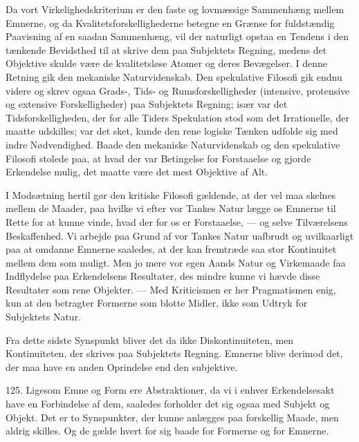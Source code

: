 \documentclass[12pt,a4paper]{book}
\newcommand{\apage}[1]{\marginnote{\footnotesize\textit{[#1]}}}
\begin{document}
Da vort Virkelighedskriterium er den faste og lovmæssige Sammenhæng mellem Emnerne, og
da Kvalitetsforskellighederne betegne en Grænse for fuldstændig Paavisning af en
saadan Sammenhæng, vil der naturligt opstaa en Tendens i den tænkende Bevidsthed til
at skrive dem paa Subjektets Regning, medens det Objektive skulde være de
kvalitetsløse Atomer og deres Bevægelser. I denne Retning gik den mekaniske
Naturvidenskab. Den spekulative Filosofi gik endnu videre og skrev ogsaa Grads-, Tids-
og Rumsforskelligheder (intensive, protensive og extensive Forskelligheder) paa
Subjektets Regning; især var det Tidsforskelligheden, der for alle Tiders
Spekulation stod som det Irrationelle, der maatte udskilles; var det sket, kunde den
rene logiske Tænken udfolde sig med indre Nødvendighed. Baade den mekaniske
Naturvidenskab og den spekulative Filosofi stolede paa, at hvad der var Betingelse for
Forstaaelse og gjorde Erkendelse mulig, det maatte være det mest Objektive af Alt.

I Modsætning hertil gør den kritiske Filosofi gældende, at der vel maa skelnes mellem de Maader, paa hvilke vi efter vor Tankes Natur lægge os Emnerne til Rette for at kunne
vinde, hvad der for os er Forstaaelse, --- og selve Tilværelsens Beskaffenhed. Vi
arbejde paa Grund af vor Tankes Natur uafbrudt og uvilkaarligt paa at omdanne Emnerne
saaledes, at der kan fremtræde saa stor Kontinuitet mellem dem som muligt. Men jo mere
vor egen Aands Natur og Virkemaade faa Indflydelse paa Erkendelsens Resultater, des
mindre kunne vi hævde disse Resultater som \apage{297} rene Objekter. --- Med Kriticismen er her
Pragmatismen enig, kun at den betragter Formerne som blotte Midler, ikke som Udtryk
for Subjektets Natur.

Fra dette sidste Synspunkt bliver det da ikke Diskontinuiteten, men Kontinuiteten, der
skrives paa Subjektets Regning. Emnerne blive derimod det, der maa have en anden
Oprindelse end den subjektive.

125. Ligesom Emne og Form ere Abstraktioner, da vi i enhver Erkendelsesakt have en
Forbindelse af dem, saaledes forholder det sig ogsaa med Subjekt og Objekt. Det er to
Synspunkter, der kunne anlægges paa forskellig Maade, men aldrig skilles. Og de gælde
hvert for sig baade for Formerne og for Emnerne.
\end{document}
